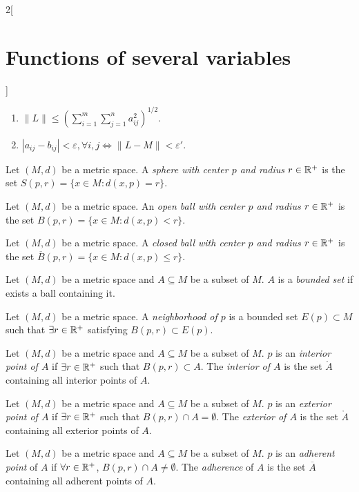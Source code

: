 \documentclass[../../../main.tex]{subfiles}
\begin{document}
\begin{multicols}{2}[\section{Functions of several variables}]
\begin{corollary}
\begin{enumerate}
    \item $\displaystyle\|L\|\leq\left(\sum_{i=1}^m\sum_{j=1}^na_{ij}^2\right)^{1/2}$.
    \item $|a_{ij}-b_{ij}|<\varepsilon,\forall i,j\iff\|L-M\|<\varepsilon'$.
\end{enumerate}
\end{corollary}
\begin{definition}
Let $(M,d)$ be a metric space. A \textit{sphere with center $p$ and radius $r\in\mathbb{R}^+$} is the set $S(p,r)=\{x\in M:d(x,p)=r\}$.
\end{definition}
\begin{definition}
Let $(M,d)$ be a metric space. An \textit{open ball with center $p$ and radius $r\in\mathbb{R}^+$} is the set $B(p,r)=\{x\in M:d(x,p)<r\}$.
\end{definition}
\begin{definition}
Let $(M,d)$ be a metric space. A \textit{closed ball with center $p$ and radius $r\in\mathbb{R}^+$} is the set $\overline{B}(p,r)=\{x\in M:d(x,p)\leq r\}$.
\end{definition}
\begin{definition}
Let $(M,d)$ be a metric space and $A\subseteq M$ be a subset of $M$. $A$ is a \textit{bounded set} if exists a ball containing it.
\end{definition}
\begin{definition}
Let $(M,d)$ be a metric space. A \textit{neighborhood of $p$} is a bounded set $E(p)\subset M$ such that $\exists r\in\mathbb{R}^+$ satisfying $B(p,r)\subset E(p)$.
\end{definition}
\begin{definition}
Let $(M,d)$ be a metric space and $A\subseteq M$ be a subset of $M$. $p$ is an \textit{interior point of $A$} if $\exists r\in\mathbb{R}^+$ such that $B(p,r)\subset A$. The \textit{interior of $A$} is the set $\mathring A$ containing all interior points of $A$.
\end{definition}
\begin{definition}
Let $(M,d)$ be a metric space and $A\subseteq M$ be a subset of $M$. $p$ is an \textit{exterior point of $A$} if $\exists r\in\mathbb{R}^+$ such that $B(p,r)\cap A=\emptyset$. The \textit{exterior of $A$} is the set $\mathring A$ containing all exterior points of $A$.
\end{definition}
\begin{definition}
Let $(M,d)$ be a metric space and $A\subseteq M$ be a subset of $M$. $p$ is an \textit{adherent point} of $A$ if $\forall r\in\mathbb{R}^+$, $B(p,r)\cap A\ne\emptyset$. The \textit{adherence} of $A$ is the set $\overline{A}$ containing all adherent points of $A$.

\end{definition}
\end{multicols}
\end{document}
